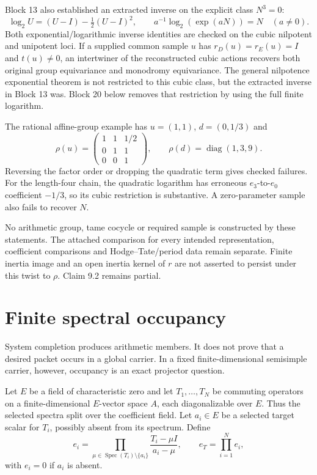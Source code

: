 \documentclass[11pt]{article}
\theoremstyle{definition}
\theoremstyle{remark}
\newcommand{\Spec}{\operatorname{Spec}}
\begin{document}
Block 13 also established an extracted inverse on the explicit class $N^3=0$:
\[
\log_2 U=(U-I)-\tfrac12(U-I)^2,\qquad
 a^{-1}\log_2(\exp(aN))=N\quad(a\ne0).
\]
Both exponential/logarithmic inverse identities are checked on the cubic
nilpotent and unipotent loci. If a supplied common sample $u$ has
$r_D(u)=r_E(u)=I$ and $t(u)\ne0$, an intertwiner of the reconstructed cubic
actions recovers both original group equivariance and monodromy equivariance.
The general nilpotence exponential theorem is not restricted to this cubic
class, but the extracted inverse in Block 13 was. Block 20 below removes
that restriction by using the full finite logarithm.

The rational affine-group example has $u=(1,1)$, $d=(0,1/3)$ and
\[
\rho(u)=\begin{pmatrix}1&1&1/2\\0&1&1\\0&0&1\end{pmatrix},
\qquad \rho(d)=\operatorname{diag}(1,3,9).
\]
Reversing the factor order or dropping the quadratic term gives checked
failures. For the length-four chain, the quadratic logarithm has erroneous
$e_3$-to-$e_0$ coefficient $-1/3$, so its cubic restriction is substantive.
A zero-parameter sample also fails to recover $N$.

No arithmetic group, tame cocycle or required sample is constructed by these
statements. The attached comparison for every intended representation,
coefficient comparisons and Hodge--Tate/period data remain separate. Finite
inertia image and an open inertia kernel of $r$ are not asserted to persist
under this twist to $\rho$. Claim 9.2 remains partial.

\section{Finite spectral occupancy}

System completion produces arithmetic members.  It does not prove that a desired packet occurs in a global carrier.  In a fixed finite-dimensional semisimple carrier, however, occupancy is an exact projector question.

Let \(E\) be a field of characteristic zero and let \(T_1,\ldots,T_N\) be commuting operators on a finite-dimensional \(E\)-vector space \(A\), each diagonalizable over \(E\).  Thus the selected spectra split over the coefficient field.  Let \(a_i\in E\) be a selected target scalar for \(T_i\), possibly absent from its spectrum.  Define
\[
e_i
=
\prod_{\mu\in\Spec(T_i)\setminus\{a_i\}}
\frac{T_i-\mu I}{a_i-\mu},
\qquad
e_T=\prod_{i=1}^{N}e_i,
\]
with \(e_i=0\) if \(a_i\) is absent.
\end{document}
